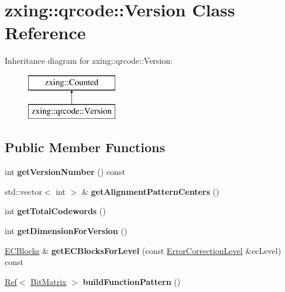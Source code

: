 \hypertarget{classzxing_1_1qrcode_1_1_version}{}\section{zxing\+:\+:qrcode\+:\+:Version Class Reference}
\label{classzxing_1_1qrcode_1_1_version}
Inheritance diagram for zxing\+:\+:qrcode\+:\+:Version\+:\begin{figure}[H]
\begin{center}
\leavevmode
\includegraphics[height=2.000000cm]{classzxing_1_1qrcode_1_1_version}
\end{center}
\end{figure}
\subsection*{Public Member Functions}
\begin{DoxyCompactItemize}
\item 
\mbox{\label{classzxing_1_1qrcode_1_1_version_a50252be321fb7b25a26b7666ccb9a998}} 
int {\bfseries get\+Version\+Number} () const
\item 
\mbox{\label{classzxing_1_1qrcode_1_1_version_aec794cfa96973ccec23b7ac1bd12ed47}} 
std\+::vector$<$ int $>$ \& {\bfseries get\+Alignment\+Pattern\+Centers} ()
\item 
\mbox{\label{classzxing_1_1qrcode_1_1_version_ae00f4413dfc99337b9481808e39c60b8}} 
int {\bfseries get\+Total\+Codewords} ()
\item 
\mbox{\label{classzxing_1_1qrcode_1_1_version_a39b8791a6e462470fcf1e6e1f892d8f8}} 
int {\bfseries get\+Dimension\+For\+Version} ()
\item 
\mbox{\label{classzxing_1_1qrcode_1_1_version_a19f010159b4884e878d674fa0b9641f6}} 
\mbox{\hyperlink{classzxing_1_1qrcode_1_1_e_c_blocks}{E\+C\+Blocks}} \& {\bfseries get\+E\+C\+Blocks\+For\+Level} (const \mbox{\hyperlink{classzxing_1_1qrcode_1_1_error_correction_level}{Error\+Correction\+Level}} \&ec\+Level) const
\item 
\mbox{\label{classzxing_1_1qrcode_1_1_version_acdd5b4736b7c8137adab2b6be4a00232}} 
\mbox{\hyperlink{classzxing_1_1_ref}{Ref}}$<$ \mbox{\hyperlink{classzxing_1_1_bit_matrix}{Bit\+Matrix}} $>$ {\bfseries build\+Function\+Pattern} ()
\end{DoxyCompactItemize}

